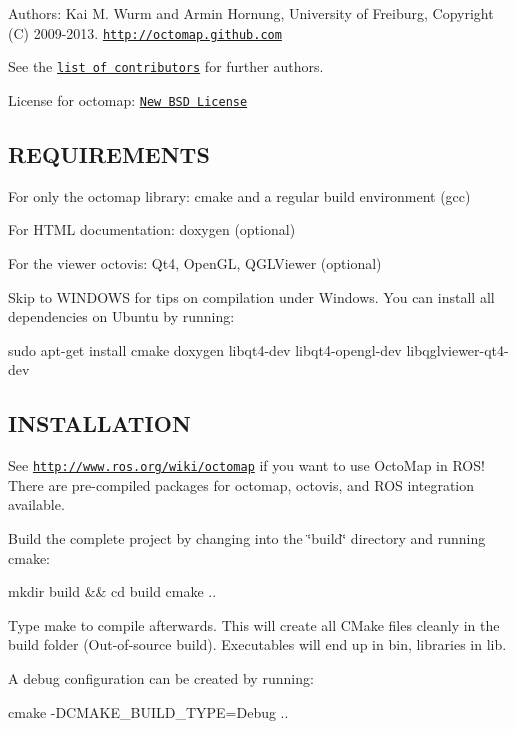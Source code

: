 Authors\+: Kai M. Wurm and Armin Hornung, University of Freiburg, Copyright (C) 2009-\/2013. \href{http://octomap.github.com}{\tt http\+://octomap.\+github.\+com}

See the \href{AUTHORS.txt}{\tt list of contributors} for further authors.

License for octomap\+: \href{LICENSE.txt}{\tt New B\+S\+D License}

\subsection*{R\+E\+Q\+U\+I\+R\+E\+M\+E\+N\+T\+S }


\begin{DoxyItemize}
\item For only the octomap library\+: cmake and a regular build environment (gcc)
\item For H\+T\+M\+L documentation\+: doxygen (optional)
\item For the viewer octovis\+: Qt4, Open\+G\+L, Q\+G\+L\+Viewer (optional)
\end{DoxyItemize}

Skip to W\+I\+N\+D\+O\+W\+S for tips on compilation under Windows. You can install all dependencies on Ubuntu by running\+: \begin{DoxyVerb}sudo apt-get install cmake doxygen libqt4-dev libqt4-opengl-dev libqglviewer-qt4-dev
\end{DoxyVerb}


\subsection*{I\+N\+S\+T\+A\+L\+L\+A\+T\+I\+O\+N }

See \href{http://www.ros.org/wiki/octomap}{\tt http\+://www.\+ros.\+org/wiki/octomap} if you want to use Octo\+Map in R\+O\+S! There are pre-\/compiled packages for octomap, octovis, and R\+O\+S integration available.

Build the complete project by changing into the \char`\"{}build\char`\"{} directory and running cmake\+: \begin{DoxyVerb}mkdir build && cd build 
cmake ..
\end{DoxyVerb}


Type {\ttfamily make} to compile afterwards. This will create all C\+Make files cleanly in the {\ttfamily build} folder (Out-\/of-\/source build). Executables will end up in {\ttfamily bin}, libraries in {\ttfamily lib}.

A debug configuration can be created by running\+: \begin{DoxyVerb}cmake -DCMAKE_BUILD_TYPE=Debug ..
\end{DoxyVerb}


